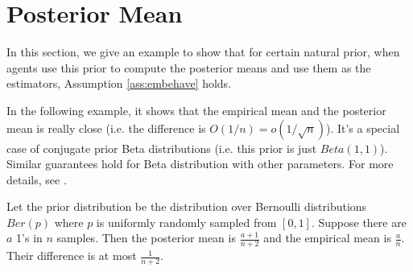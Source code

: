 \section{Posterior Mean}
 In this section, we give an example to show that for certain natural prior, when agents use this prior to compute the posterior means and use them as the estimators, Assumption \ref{ass:embehave} holds. 

In the following example, it shows that the empirical mean and the posterior mean is really close (i.e. the difference is $O(1/n) = o(1/\sqrt{n})$). It's a special case of conjugate prior Beta distributions (i.e. this prior is just $Beta(1,1)$). Similar guarantees hold for Beta distribution with other parameters. For more details, see \cite{https://en.wikipedia.org/wiki/Conjugate_prior}.
\begin{example}
Let the prior distribution be the distribution over Bernoulli distributions $Ber(p)$ where $p$ is uniformly randomly sampled from $[0,1]$. Suppose there are $a$ 1's in $n$ samples. Then the posterior mean is $\frac{a+1}{n+2}$ and the empirical mean is $\frac{a}{n}$. Their difference is at most $\frac{1}{n+2}$. 
\end{example}




